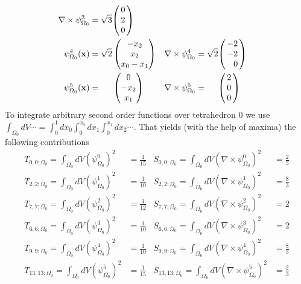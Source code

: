 \documentclass{scrartcl}
\newenvironment{Matrix}[1]{\left(\mspace{-6mu}\begin{array}{*{#1}{r}}}{\end{array}\mspace{-6mu}\right)}
\newenvironment{Vector}{\begin{Matrix}1}{\end{Matrix}}
\newcommand\psqrt{\phantom{\sqrt0}}
\begin{document}
\begin{align}
  \nabla\times\psi_{\Omega_0}^3
    &=\sqrt3\begin{Vector}  0 \\  2 \\  0 \end{Vector}
\\
  \psi_{\Omega_0}^4(\mathbf x)
    &=\sqrt2\begin{pmatrix} -x_2 \\ x_2 \\ x_0-x_1 \end{pmatrix} &
  \nabla\times\psi_{\Omega_0}^4
    &=\sqrt2\begin{Vector} -2 \\ -2 \\  0 \end{Vector}
\\
  \psi_{\Omega_0}^5(\mathbf x)
    &=\psqrt\begin{pmatrix} 0 \\ -x_2 \\ x_1 \end{pmatrix} &
  \nabla\times\psi_{\Omega_0}^5
    &=\psqrt\begin{Vector}  2 \\  0 \\  0 \end{Vector}
\end{align}
To integrate arbitrary second order functions over tetrahedron 0 we use
$\int_{\Omega_0}dV\cdots=\int_0^1dx_0\int_0^{x_0}dx_1\int_0^{x_1}dx_2\cdots$.
That yields (with the help of maxima) the following contributions
\begin{align}
  T_{ 0, 0;\Omega_0}=\int_{\Omega_0}dV(\psi^0_{\Omega_0})^2
  &=\frac1{15} &
  S_{ 0, 0;\Omega_0}=\int_{\Omega_0}dV(\nabla\times\psi^0_{\Omega_0})^2
  &=\frac23 \\
  T_{ 2, 2;\Omega_0}=\int_{\Omega_0}dV(\psi^1_{\Omega_0})^2
  &=\frac1{10} &
  S_{ 2, 2;\Omega_0}=\int_{\Omega_0}dV(\nabla\times\psi^1_{\Omega_0})^2
  &=\frac83 \\
  T_{ 7, 7;\Omega_0}=\int_{\Omega_0}dV(\psi^2_{\Omega_0})^2
  &=\frac1{12} &
  S_{ 7, 7;\Omega_0}=\int_{\Omega_0}dV(\nabla\times\psi^2_{\Omega_0})^2
  &=2 \\
  T_{ 6, 6;\Omega_0}=\int_{\Omega_0}dV(\psi^3_{\Omega_0})^2
  &=\frac1{10} &
  S_{ 6, 6;\Omega_0}=\int_{\Omega_0}dV(\nabla\times\psi^3_{\Omega_0})^2
  &=2 \\
  T_{ 9, 9;\Omega_0}=\int_{\Omega_0}dV(\psi^4_{\Omega_0})^2
  &=\frac1{10} &
  S_{ 9, 9;\Omega_0}=\int_{\Omega_0}dV(\nabla\times\psi^4_{\Omega_0})^2
  &=\frac83 \\
  T_{13,13;\Omega_0}=\int_{\Omega_0}dV(\psi^5_{\Omega_0})^2
  &=\frac1{15} &
  S_{13,13;\Omega_0}=\int_{\Omega_0}dV(\nabla\times\psi^5_{\Omega_0})^2
  &=\frac23
\end{align}
\end{document}
